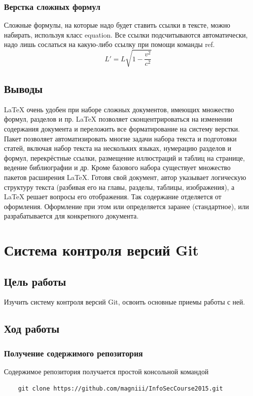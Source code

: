 \documentclass[a4paper, 14pt]{article}				%
\begin{document}
\subsubsection{Верстка сложных формул}
Сложные формулы, на которые надо будет ставить ссылки в тексте, можно набирать, используя класс equation. Все ссылки подсчитываются автоматически, надо лишь сослаться на какую-либо ссылку при помощи команды ref.
\begin{equation}
  L' = {L}{\sqrt{1-\frac{v^2}{c^2}}}
 \end{equation}
\subsection{Выводы}
\LaTeX{} очень удобен при наборе сложных документов, имеющих множество формул, разделов и пр. \LaTeX{} позволяет сконцентрироваться на изменении содержания документа и переложить все форматирование на систему верстки. Пакет позволяет автоматизировать многие задачи набора текста и подготовки статей, включая набор текста на нескольких языках, нумерацию разделов и формул, перекрёстные ссылки, размещение иллюстраций и таблиц на странице, ведение библиографии и др. Кроме базового набора существует множество пакетов расширения \LaTeX{}. Готовя свой документ, автор указывает логическую структуру текста (разбивая его на главы, разделы, таблицы, изображения), а \LaTeX{} решает вопросы его отображения. Так содержание отделяется от оформления. Оформление при этом или определяется заранее (стандартное), или разрабатывается для конкретного документа.

\newpage
\section{Система контроля версий Git}
\subsection{Цель работы}
Изучить систему контроля версий Git, освоить основные приемы работы с ней.
\subsection{Ход работы}
\subsubsection{Получение содержимого репозитория}
Содержимое репозитория получается простой консольной командой 
\begin{verbatim}
	git clone https://github.com/magniii/InfoSecCourse2015.git
\end{verbatim}
\end{document}
